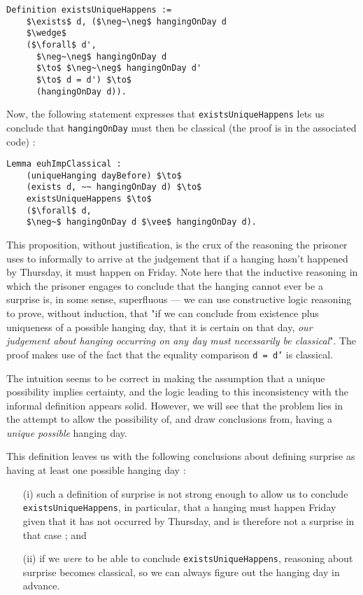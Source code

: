 \documentclass[journal]{journal}
\begin{document}
\begin{lstlisting}[mathescape=true]
  Definition existsUniqueHappens :=
    $\exists$ d, ($\neg~\neg$ hangingOnDay d
    $\wedge$
    ($\forall$ d',
      $\neg~\neg$ hangingOnDay d
      $\to$ $\neg~\neg$ hangingOnDay d'
      $\to$ d = d') $\to$
      (hangingOnDay d)).
\end{lstlisting}

Now, the following statement expresses that {\tt existsUniqueHappens} lets us
conclude that {\tt hangingOnDay} must then be classical (the proof is in the
associated code) :

\begin{lstlisting}[mathescape=true]
  Lemma euhImpClassical :
    (uniqueHanging dayBefore) $\to$
    (exists d, ~~ hangingOnDay d) $\to$
    existsUniqueHappens $\to$
    ($\forall$ d,
    $\neg~$ hangingOnDay d $\vee$ hangingOnDay d).
\end{lstlisting}

This proposition, without justification, is the crux of the reasoning the prisoner
uses to informally to arrive at the judgement that
if a hanging hasn't happened by Thursday, it must happen on Friday.
Note here that the inductive reasoning in which the prisoner engages to conclude that the
hanging cannot ever be a surprise is, in some sense, superfluous --- we can use
constructive logic reasoning to prove, without induction, that "if we can conclude
from existence plus uniqueness of a possible hanging day, that it is certain on that day,
\emph{our judgement about hanging occurring on any day must necessarily be classical}".
The proof makes use of the fact that the equality comparison {\tt d = d'} is
classical.

The intuition seems to be correct in making the assumption that a unique possibility
implies certainty, and the logic leading to this inconsistency with the informal
definition appears solid.
However, we will see that the problem lies in the attempt
to allow the possibility of, and draw conclusions from, having a \emph{unique possible }
hanging day.

This definition leaves us with the following conclusions about defining surprise as
having at least one possible hanging day :

\begin{itemize}
  \item[(i)] such a definition of surprise is not strong enough to allow us to conclude
  {\tt existsUniqueHappens}, in particular, that a hanging
  must happen Friday given that it has not occurred by Thursday, and is
  therefore not a surprise in that case ; and \newline
  \item[(ii)] if we \emph{were} to be able to conclude {\tt existsUniqueHappens},
  reasoning about surprise
  becomes classical, so we can always figure out the hanging day in advance.
\end{itemize}
\end{document}
